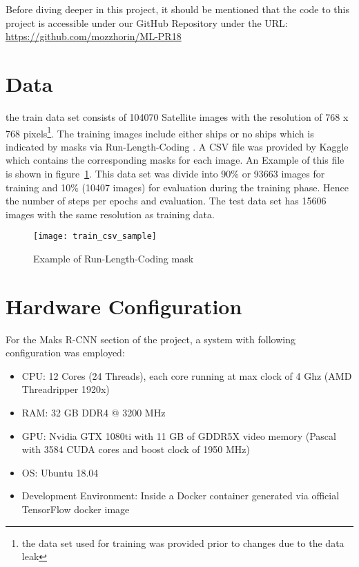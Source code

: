 \noindent
Before diving deeper in this project, it should be mentioned that the code to this project is accessible under our GitHub Repository under the URL: \url{https://github.com/mozzhorin/ML-PR18}

\section{Data}
\label{sec:data}

the train data set consists of 104070 Satellite images with the resolution of 768 x 768 pixels\footnote{the data set used for training was provided prior to changes due to the data leak\cite{dataleak}}. The training images include either ships or no ships which is indicated by masks via Run-Length-Coding . A CSV file was provided by Kaggle which contains the corresponding masks for each image. An Example of this file is shown in figure~\ref{fig:rlemask}. This data set was divide into 90\% or 93663 images for training and 10\% (10407 images) for evaluation during the training phase. Hence the number of steps per epochs and evaluation. The test data set has 15606 images with the same resolution as training data.
\begin{figure}[h!]
  \centering
  \texttt{[image: train\_csv\_sample]}
  \caption[Example of Run-Length-Coding mask]
   {Example of Run-Length-Coding mask}
   \label{fig:rlemask}
\end{figure}

\section{Hardware Configuration}
\label{sec:hardwareconfig}

For the Maks R-CNN section of the project, a system with following configuration was employed:
\begin{itemize}
\item CPU: 12 Cores (24 Threads), each core running at max clock of 4 Ghz (AMD Threadripper 1920x)
\item RAM: 32 GB DDR4 @ 3200 MHz
\item GPU: Nvidia GTX 1080ti with 11 GB of GDDR5X video memory (Pascal with 3584 CUDA cores and boost clock of 1950 MHz)
\item OS: Ubuntu 18.04
\item Development Environment: Inside a Docker container generated via official TensorFlow docker image
\end{itemize}

